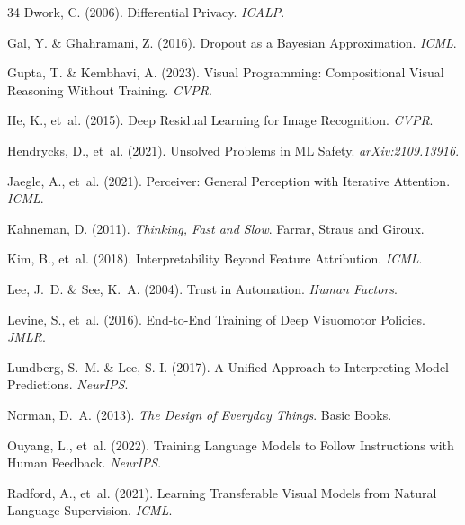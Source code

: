 \documentclass[11pt,a4paper]{article}
\begin{document}
\begin{thebibliography}{34}
Dwork, C. (2006).
\newblock Differential Privacy.
\newblock \emph{ICALP}.

Gal, Y. \& Ghahramani, Z. (2016).
\newblock Dropout as a Bayesian Approximation.
\newblock \emph{ICML}.

Gupta, T. \& Kembhavi, A. (2023).
\newblock Visual Programming: Compositional Visual Reasoning Without Training.
\newblock \emph{CVPR}.

He, K., et~al. (2015).
\newblock Deep Residual Learning for Image Recognition.
\newblock \emph{CVPR}.

Hendrycks, D., et~al. (2021).
\newblock Unsolved Problems in ML Safety.
\newblock \emph{arXiv:2109.13916}.

Jaegle, A., et~al. (2021).
\newblock Perceiver: General Perception with Iterative Attention.
\newblock \emph{ICML}.

Kahneman, D. (2011).
\newblock \emph{Thinking, Fast and Slow}.
\newblock Farrar, Straus and Giroux.

Kim, B., et~al. (2018).
\newblock Interpretability Beyond Feature Attribution.
\newblock \emph{ICML}.

Lee, J.~D. \& See, K.~A. (2004).
\newblock Trust in Automation.
\newblock \emph{Human Factors}.

Levine, S., et~al. (2016).
\newblock End-to-End Training of Deep Visuomotor Policies.
\newblock \emph{JMLR}.

Lundberg, S.~M. \& Lee, S.-I. (2017).
\newblock A Unified Approach to Interpreting Model Predictions.
\newblock \emph{NeurIPS}.

Norman, D.~A. (2013).
\newblock \emph{The Design of Everyday Things}.
\newblock Basic Books.

Ouyang, L., et~al. (2022).
\newblock Training Language Models to Follow Instructions with Human Feedback.
\newblock \emph{NeurIPS}.

Radford, A., et~al. (2021).
\newblock Learning Transferable Visual Models from Natural Language Supervision.
\newblock \emph{ICML}.


\end{thebibliography}
\end{document}
